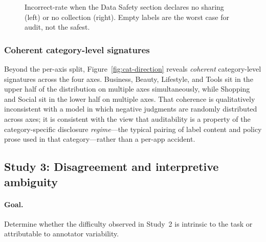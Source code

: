 \documentclass[11pt,a4paper]{article}
\begin{document}
\begin{figure}[t]
\centering
{}
\caption{Incorrect-rate when the Data Safety section declares no
sharing (left) or no collection (right). Empty labels are the worst
case for audit, not the safest.}
\label{fig:no-data}
\end{figure}

\subsubsection{Coherent category-level signatures}
Beyond the per-axis split, Figure~\ref{fig:cat-direction} reveals
\emph{coherent} category-level signatures across the four axes.
Business, Beauty, Lifestyle, and Tools sit in the upper half of the
distribution on multiple axes simultaneously, while Shopping and
Social sit in the lower half on multiple axes. That coherence is
qualitatively inconsistent with a model in which negative judgments
are randomly distributed across axes; it is consistent with the view
that auditability is a property of the category-specific disclosure
\emph{regime}---the typical pairing of label content and policy prose
used in that category---rather than a per-app accident.

\subsection{Study 3: Disagreement and interpretive ambiguity}
\label{sec:study3}
\paragraph{Goal.} Determine whether the difficulty observed in Study~2
is intrinsic to the task or attributable to annotator variability.
\end{document}
